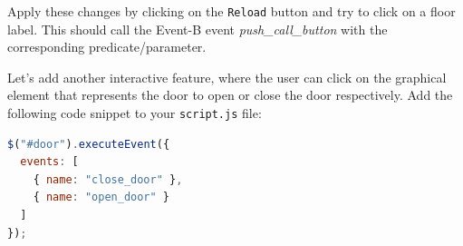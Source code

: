 Apply these changes by clicking on the \texttt{Reload} button and try to click on a floor label.
This should call the Event-B event \textit{push\_call\_button} with the corresponding predicate/parameter.

Let's add another interactive feature, where the user can click on the graphical element that represents the door to open or close the door respectively.
%
Add the following code snippet to your \texttt{script.js} file:
\begin{lstlisting}[language=JavaScript, caption={Interaction with the Lift Door (JavaScript)}]
$("#door").executeEvent({
  events: [
    { name: "close_door" }, 
    { name: "open_door" }
  ]
});
\end{lstlisting}

